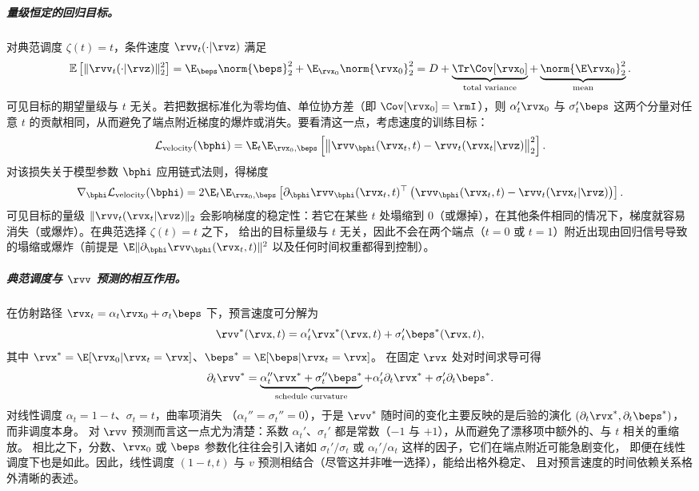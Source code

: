 \subparagraph{量级恒定的回归目标。}
对典范调度 $\zeta(t)=t$，条件速度 $\rvv_t(\cdot |\rvz)$ 满足
\begin{align}\label{eq:unit-velocity}
\mathbb{E}\left[\|\rvv_t(\cdot |\rvz)\|_2^2\right]
=\E_{\beps}\norm{\beps}_2^2+\E_{\rvx_0}\norm{\rvx_0}^2_2 = D + \underbrace{\Tr\Cov[\rvx_0]}_{\text{total variance}}+\underbrace{\norm{\E\rvx_0}^2_2}_{\text{mean}}.
\end{align}
可见目标的期望量级与 $t$ 无关。若把数据标准化为零均值、单位协方差（即 $\Cov[\rvx_0]=\rmI$），则
$\alpha_t'\rvx_0$ 与 $\sigma_t'\beps$ 这两个分量对任意 $t$ 的贡献相同，从而避免了端点附近梯度的爆炸或消失。要看清这一点，考虑速度的训练目标：
\[
\mathcal{L}_{\mathrm{velocity}}(\bphi)
= \E_{t}  \E_{\rvx_0,\beps}\left[\big\|\rvv_{\bphi}(\rvx_t,t) - \rvv_t(\rvx_t|\rvz)\big\|_2^2
\right].
\]
对该损失关于模型参数 $\bphi$ 应用链式法则，得梯度
\[
\nabla_{\bphi}\mathcal{L}_{\mathrm{velocity}}(\bphi)
= 2  \E_{t}  \E_{\rvx_0,\beps} \left[
  \partial_{\bphi}\rvv_{\bphi}(\rvx_t,t)^{\top} \left(\rvv_{\bphi}(\rvx_t,t) - \rvv_t(\rvx_t|\rvz)\right)
\right].
\]
可见目标的量级 $\|\rvv_t(\rvx_t|\rvz)\|_2$ 会影响梯度的稳定性：若它在某些 $t$ 处塌缩到 $0$（或爆掉），在其他条件相同的情况下，梯度就容易消失（或爆炸）。在典范选择 $\zeta(t)=t$ 之下， 给出的目标量级与 $t$ 无关，因此不会在两个端点（$t=0$ 或 $t=1$）附近出现由回归信号导致的塌缩或爆炸（前提是 $\E\|\partial_{\bphi}\rvv_{\bphi}(\rvx_t,t)\|^2$ 以及任何时间权重都得到控制）。
\subparagraph{典范调度与 $\rvv$ 预测的相互作用。}
在仿射路径 $\rvx_t=\alpha_t \rvx_0+\sigma_t\beps$ 下，预言速度可分解为
\[
\rvv^*(\rvx, t)=\alpha_t' \rvx^*(\rvx,t)+\sigma_t' \beps^*(\rvx,t),
\]
其中 $\rvx^*=\E[\rvx_0|\rvx_t=\rvx]$、$\beps^*=\E[\beps|\rvx_t=\rvx]$。
在固定 $\rvx$ 处对时间求导可得
\[
\partial_t \rvv^*
=\underbrace{\alpha_t'' \rvx^*+\sigma_t'' \beps^*}_{\text{schedule curvature}}
+ \alpha_t' \partial_t \rvx^*+\sigma_t' \partial_t \beps^*.
\]
对线性调度 $\alpha_t=1-t$、$\sigma_t=t$，曲率项消失
（$\alpha_t''=\sigma_t''=0$），于是 $\rvv^*$ 随时间的变化主要反映的是后验的演化 $(\partial_t \rvx^*,\partial_t \beps^*)$，而非调度本身。
对 $\rvv$ 预测而言这一点尤为清楚：系数 $\alpha_t'$、$\sigma_t'$
都是常数（$-1$ 与 $+1$），从而避免了漂移项中额外的、与 $t$ 相关的重缩放。
相比之下，分数、$\rvx_0$ 或 $\beps$ 参数化往往会引入诸如
$\sigma_t'/\sigma_t$ 或 $\alpha_t'/\alpha_t$ 这样的因子，它们在端点附近可能急剧变化，
即便在线性调度下也是如此。因此，线性调度
$(1-t,t)$ 与 $v$ 预测相结合（尽管这并非唯一选择），能给出格外稳定、
且对预言速度的时间依赖关系格外清晰的表述。

